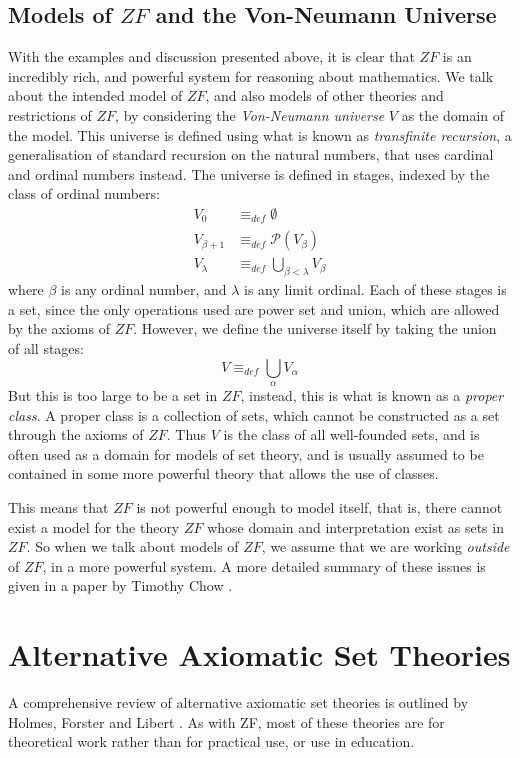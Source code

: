 \documentclass[11pt]{report}
\newcommand{\eqdef}{\equiv_\mathit{def}}
\theoremstyle{definition}
\theoremstyle{theorem}
\theoremstyle{lemma}
\begin{document}
\subsection{Models of $\mathit{ZF}$ and the Von-Neumann Universe}
With the examples and discussion presented above, it is clear that $\mathit{ZF}$ is an incredibly rich, and powerful system for reasoning about mathematics.
We talk about the intended model of $\mathit{ZF}$, and also models of other theories and restrictions of $ZF$, by considering the \emph{Von-Neumann universe} $V$ as the domain of the model. This universe is defined using what is known as \emph{transfinite recursion}, a generalisation of standard recursion on the natural numbers, that uses cardinal and ordinal numbers instead. The universe is defined in stages, indexed by the class of ordinal numbers:
\begin{align*}
  V_0 &\eqdef \emptyset \\
  V_{\beta+1} &\eqdef \mathcal{P}(V_\beta)\\
  V_{\lambda} &\eqdef \bigcup_{\beta<\lambda} V_\beta
\end{align*}
where $\beta$ is any ordinal number, and $\lambda$ is any limit ordinal.
Each of these stages is a set, since the only operations used are power set and union, which are allowed by the axioms of $\mathit{ZF}$. However, we define the universe itself by taking the union of all stages:
$$V \eqdef \bigcup_\alpha V_\alpha$$
But this is too large to be a set in $\mathit{ZF}$, instead, this is what is known as a \emph{proper class}.
A proper class is a collection of sets, which cannot be constructed as a set through the axioms of $\mathit{ZF}$.
Thus $V$ is the class of all well-founded sets, and is often used as a domain for models of set theory, and is usually assumed to be contained in some more powerful theory that allows the use of classes.

This means that $\mathit{ZF}$ is not powerful enough to model itself, that is, there cannot exist a model for the theory $\mathit{ZF}$ whose domain and interpretation exist as sets in $\mathit{ZF}$.
So when we talk about models of $ZF$, we assume that we are working \emph{outside} of $\mathit{ZF}$, in a more powerful system. A more detailed summary of these issues is given in a paper by Timothy Chow \cite{force}.

\section{Alternative Axiomatic Set Theories}
A comprehensive review of alternative axiomatic set theories is outlined by Holmes, Forster and Libert \cite{ast}.
As with ZF, most of these theories are for theoretical work rather than for practical use, or use in education.
\end{document}
